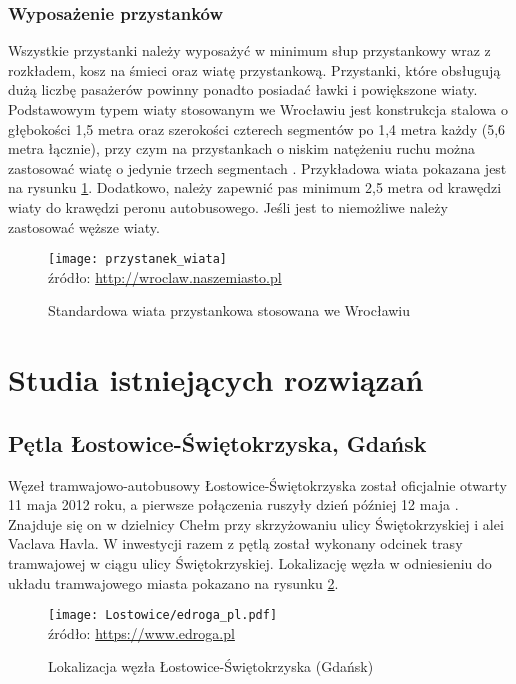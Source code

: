 \documentclass[twoside,12pt]{article}
\begin{document}
	\subsubsection{Wyposażenie przystanków}
	
	Wszystkie przystanki należy wyposażyć w minimum słup przystankowy wraz z rozkładem, kosz na śmieci oraz wiatę przystankową. Przystanki, które obsługują dużą liczbę pasażerów powinny ponadto posiadać ławki i powiększone wiaty. Podstawowym typem wiaty stosowanym we Wrocławiu jest konstrukcja stalowa o głębokości 1,5 metra oraz szerokości czterech segmentów po 1,4 metra każdy (5,6 metra łącznie), przy czym na przystankach o niskim natężeniu ruchu można zastosować wiatę o jedynie trzech segmentach \cite{standardy_wroclaw}. Przykładowa wiata pokazana jest na rysunku \ref{przystanek_wiata}. Dodatkowo, należy zapewnić pas minimum 2,5 metra od krawędzi wiaty do krawędzi peronu autobusowego. Jeśli jest to niemożliwe należy zastosować węższe wiaty. 
	
		\begin{figure}[H]
		\centering
		\caption{Standardowa wiata przystankowa stosowana we Wrocławiu}
		\texttt{[image: przystanek\_wiata]}\\
		\footnotesize{źródło: \url{http://wroclaw.naszemiasto.pl}}
		\label{przystanek_wiata}
	\end{figure}
	

	\clearpage
	\section{Studia istniejących rozwiązań}

	\subsection{Pętla Łostowice-Świętokrzyska, Gdańsk}
	
	Węzeł tramwajowo-autobusowy Łostowice-Świętokrzyska został oficjalnie otwarty 11 maja 2012 roku, a pierwsze połączenia ruszyły dzień później 12 maja \cite{gazeta_gdansk}. Znajduje się on w dzielnicy Chełm przy skrzyżowaniu ulicy Świętokrzyskiej i alei Vaclava Havla. W inwestycji razem z pętlą został wykonany odcinek trasy tramwajowej w ciągu ulicy Świętokrzyskiej. Lokalizację węzła w odniesieniu do układu tramwajowego miasta pokazano na rysunku \ref{lostowice1}.
	
	\begin{figure}[H]
		\centering
		\caption{Lokalizacja węzła Łostowice-Świętokrzyska (Gdańsk)}
		\texttt{[image: Lostowice/edroga\_pl.pdf]}\\
		\footnotesize{źródło: \url{https://www.edroga.pl}}
		\label{lostowice1}
	\end{figure}
	
\end{document}
